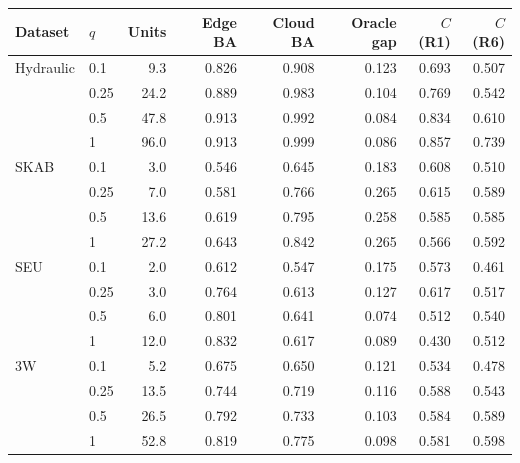 \begin{tabular}{@{}l l rrrrrr@{}}
\toprule
Dataset & $q$ & Units & Edge BA & Cloud BA & Oracle gap & $C$(R1) & $C$(R6) \\
\midrule
Hydraulic & 0.1 & 9.3 & 0.826 & 0.908 & 0.123 & 0.693 & 0.507 \\
 & 0.25 & 24.2 & 0.889 & 0.983 & 0.104 & 0.769 & 0.542 \\
 & 0.5 & 47.8 & 0.913 & 0.992 & 0.084 & 0.834 & 0.610 \\
 & 1 & 96.0 & 0.913 & 0.999 & 0.086 & 0.857 & 0.739 \\
SKAB & 0.1 & 3.0 & 0.546 & 0.645 & 0.183 & 0.608 & 0.510 \\
 & 0.25 & 7.0 & 0.581 & 0.766 & 0.265 & 0.615 & 0.589 \\
 & 0.5 & 13.6 & 0.619 & 0.795 & 0.258 & 0.585 & 0.585 \\
 & 1 & 27.2 & 0.643 & 0.842 & 0.265 & 0.566 & 0.592 \\
SEU & 0.1 & 2.0 & 0.612 & 0.547 & 0.175 & 0.573 & 0.461 \\
 & 0.25 & 3.0 & 0.764 & 0.613 & 0.127 & 0.617 & 0.517 \\
 & 0.5 & 6.0 & 0.801 & 0.641 & 0.074 & 0.512 & 0.540 \\
 & 1 & 12.0 & 0.832 & 0.617 & 0.089 & 0.430 & 0.512 \\
3W & 0.1 & 5.2 & 0.675 & 0.650 & 0.121 & 0.534 & 0.478 \\
 & 0.25 & 13.5 & 0.744 & 0.719 & 0.116 & 0.588 & 0.543 \\
 & 0.5 & 26.5 & 0.792 & 0.733 & 0.103 & 0.584 & 0.589 \\
 & 1 & 52.8 & 0.819 & 0.775 & 0.098 & 0.581 & 0.598 \\
\bottomrule
\end{tabular}
